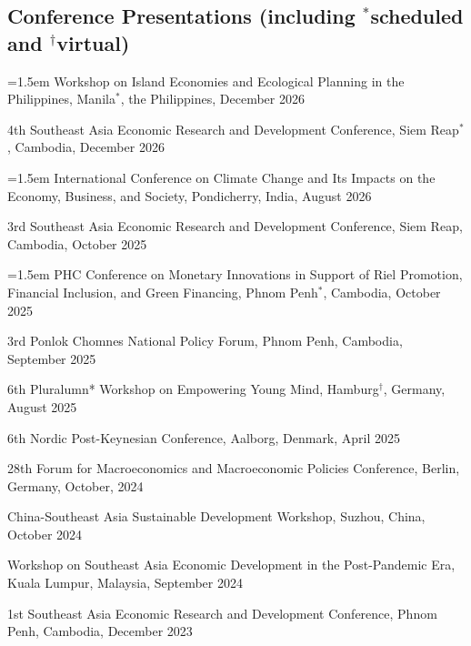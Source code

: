 \documentclass[10pt,a4paper]{article}
\begin{document}
\subsection*{Conference Presentations (including $^\ast$scheduled and $^\dag$virtual)}


\hangindent=1.5em
Workshop on Island Economies and Ecological Planning in the Philippines, Manila$^\ast$, the Philippines, December 2026

4th Southeast Asia Economic Research and Development Conference, Siem Reap$^\ast$, Cambodia, December 2026

\hangindent=1.5em
International Conference on Climate Change and Its Impacts on the Economy, Business, and Society,
Pondicherry, India, August 2026


3rd Southeast Asia Economic Research and Development Conference, Siem Reap, Cambodia, October 2025


\hangindent=1.5em
PHC Conference on Monetary Innovations in Support of Riel Promotion, Financial Inclusion, and Green Financing, Phnom Penh$^\ast$, Cambodia, October 2025

3rd Ponlok Chomnes National Policy Forum, Phnom Penh, Cambodia, September 2025

6th Pluralumn* Workshop on Empowering Young Mind, Hamburg$^\dag$, Germany, August 2025
 

6th Nordic Post-Keynesian Conference, Aalborg, Denmark, April 2025

28th Forum for Macroeconomics and Macroeconomic Policies Conference, Berlin, Germany, October, 2024

China-Southeast Asia Sustainable Development Workshop, Suzhou, China, October 2024

Workshop on Southeast Asia Economic Development in the Post-Pandemic Era, Kuala Lumpur, Malaysia, September 2024


1st Southeast Asia Economic Research and Development Conference, Phnom Penh, Cambodia, December 2023
\end{document}
